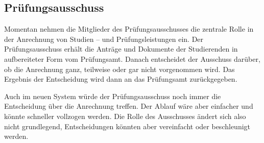 \subsection{Prüfungsausschuss}

Momentan nehmen die Mitglieder des Prüfungsausschusses die zentrale Rolle in der Anrechnung von Studien – und Prüfungsleistungen ein. Der Prüfungsausschuss erhält die Anträge und Dokumente der Studierenden in aufbereiteter Form vom Prüfungsamt. Danach entscheidet der Ausschuss darüber, ob die Anrechnung ganz, teilweise oder gar nicht vorgenommen wird. Das Ergebnis der Entscheidung wird dann an das Prüfungsamt zurückgegeben.

Auch im neuen System würde der Prüfungsausschuss noch immer die Entscheidung über die Anrechnung treffen. Der Ablauf wäre aber einfacher und könnte schneller vollzogen werden. Die Rolle des Ausschusses ändert sich also nicht grundlegend, Entscheidungen könnten aber vereinfacht oder beschleunigt werden.